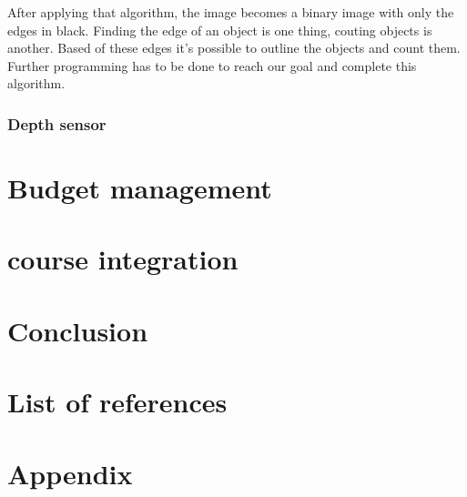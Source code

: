 \documentclass{article}
\begin{document}
After applying that algorithm, the image becomes a binary image with only the edges in black. Finding the edge of an object is one thing, couting objects is another. Based of these edges it's possible to outline the objects and count them. Further programming has to be done to reach our goal and complete this algorithm.



\subsubsection{Depth sensor}

\section{Budget management}

\section{course integration}

\section{Conclusion}

\section{List of references}

\section{Appendix}
\end{document}
